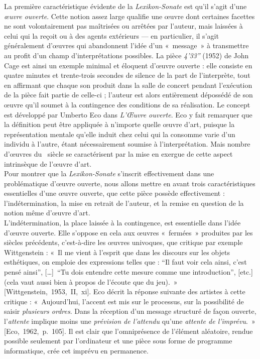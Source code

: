 \documentclass[a4paper,12pt]{article}
\newcommand{\guill}[1]{«~#1~»}
\newcommand{\guilldeux}[1]{“#1”}
\newcommand{\tpp}[0]{[\dots]}
\newcommand{\cicite}[1]{{\footnotesize[#1]}}
\begin{document}
La première caractéristique évidente de la \emph{Lexikon-Sonate} est qu'il s'agit d'une \emph{œuvre ouverte}. Cette notion assez large qualifie une œuvre dont certaines facettes ne sont volontairement pas maîtrisées ou arrêtées par l'auteur, mais laissées à celui qui la reçoit ou à des agents extérieurs --- en particulier, il s'agit généralement d'œuvres qui abandonnent l'idée d'un \guill{message} à transmettre au profit d'un champ d'interprétations possibles. La pièce \emph{4'33''} (1952) de John Cage est ainsi un exemple minimal et éloquent d'œuvre ouverte : elle consiste en quatre minutes et trente-trois secondes de silence de la part de l'interprète, tout en affirmant que chaque son produit dans la salle de concert pendant l'exécution de la pièce fait partie de celle-ci ; l'auteur est alors entièrement dépossédé de son œuvre qu'il soumet à la contingence des conditions de sa réalisation. Le concept est développé par Umberto Eco dans \emph{L'Œuvre ouverte}. Eco y fait remarquer que la définition peut être appliquée à n'importe quelle œuvre d'art, puisque la représentation mentale qu'elle induit chez celui qui la consomme varie d'un individu à l'autre, étant nécessairement soumise à l'interprétation. Mais nombre d'œuvres du \XXe~siècle se caractérisent par la mise en exergue de cette aspect intrinsèque de l'œuvre d'art. \\
Pour montrer que la \emph{Lexikon-Sonate} s'inscrit effectivement dans une problématique d'œuvre ouverte, nous allons mettre en avant trois caractéristiques essentielles d'une œuvre ouverte, que cette pièce possède effectivement : l'indétermination, la mise en retrait de l'auteur, et la remise en question de la notion même d'œuvre d'art. \\
L'indétermination, la place laissée à la contingence, est essentielle dans l'idée d'œuvre ouverte. Elle s'oppose en cela aux œuvres \guill{fermées} produites par les siècles précédents, c'est-à-dire les œuvres univoques, que critique par exemple Wittgenstein : \guill{Il me vient à l'esprit que dans les discours sur les objets esthétiques, on emploie des expressions telles que : \guilldeux{Il faut voir cela ainsi, c'est pensé ainsi}, \tpp~\guilldeux{Tu dois entendre cette mesure comme une introduction}, [etc.] (cela vaut aussi bien à propos de l'écoute que du jeu).} \cicite{Wittgenstein,~1953,~II,~xi}. Eco décrit la réponse suivante des artistes à cette critique : \guill{Aujourd'hui, l'accent est mis sur le processus, sur la possibilité de saisir \emph{plusieurs ordres}. Dans la réception d'un message structuré de façon ouverte, l'\emph{attente} implique moins une \emph{prévision de l'attendu} qu'une \emph{attente de l'imprévu}.} \cicite{Eco,~1962,~p.~105}. Il est clair que l'omniprésence de l'élément aléatoire, rendue possible seulement par l'ordinateur et une pièce sous forme de programme informatique, crée cet imprévu en permanence. \\
\end{document}

